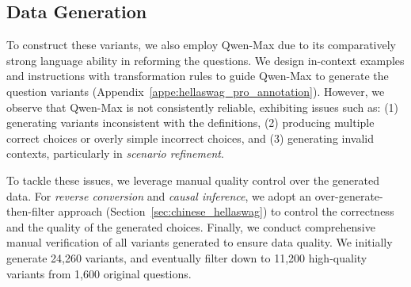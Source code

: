 \subsection{Data Generation}

To construct these variants, we also employ Qwen-Max due to its comparatively strong language ability in reforming the questions. %
We design in-context examples and instructions with transformation rules to guide Qwen-Max to generate the question variants (\cf Appendix~\ref{appe:hellaswag_pro_annotation}). 
However, we observe that Qwen-Max is not consistently reliable, exhibiting issues such as: 
(1) generating variants inconsistent with the definitions,  
(2) producing multiple correct choices or overly simple incorrect choices, 
and (3) generating invalid contexts, particularly in \emph{scenario refinement}. 

To tackle these issues, we leverage manual quality control over the generated data. 
For \emph{reverse conversion} and \emph{causal inference}, we adopt an over-generate-then-filter approach (\cf Section~\ref{sec:chinese_hellaswag}) to control the correctness and the quality of the generated choices. 
Finally, we conduct comprehensive manual verification of all variants generated to ensure data quality. We initially generate 24,260 variants, and eventually filter down to 11,200 high-quality variants from 1,600 original questions. 


